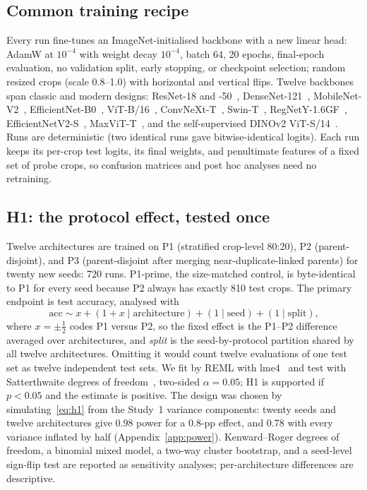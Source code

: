 \documentclass[11pt]{article}
\begin{document}
\subsection{Common training recipe}

Every run fine-tunes an ImageNet-initialised backbone with a new linear head: AdamW at
$10^{-4}$ with weight decay $10^{-4}$, batch 64, 20 epochs, final-epoch evaluation, no
validation split, early stopping, or checkpoint selection; random resized crops (scale
0.8--1.0) with horizontal and vertical flips. Twelve backbones span classic and modern
designs: ResNet-18 and -50~\citep{he2016resnet}, DenseNet-121~\citep{huang2017densenet},
MobileNet-V2~\citep{sandler2018mobilenetv2}, EfficientNet-B0~\citep{tan2019efficientnet},
ViT-B/16~\citep{dosovitskiy2021vit}, ConvNeXt-T~\citep{liu2022convnext},
Swin-T~\citep{liu2021swin}, RegNetY-1.6GF~\citep{radosavovic2020regnet},
EfficientNetV2-S~\citep{tan2021efficientnetv2}, MaxViT-T~\citep{tu2022maxvit}, and the
self-supervised DINOv2 ViT-S/14~\citep{oquab2024dinov2}. Runs are deterministic (two
identical runs gave bitwise-identical logits). Each run keeps its per-crop test logits, its
final weights, and penultimate features of a fixed set of probe crops, so confusion
matrices and post hoc analyses need no retraining.

\subsection{H1: the protocol effect, tested once}
\label{sec:h1}

Twelve architectures are trained on P1 (stratified crop-level 80:20), P2 (parent-disjoint),
and P3 (parent-disjoint after merging near-duplicate-linked parents) for twenty new seeds:
720 runs. P1-prime, the size-matched control, is byte-identical to P1 for every seed because
P2 always has exactly 810 test crops. The primary endpoint is test accuracy, analysed with
\begin{equation}
\text{acc} \sim x + (1 + x \mid \text{architecture}) + (1 \mid \text{seed}) + (1 \mid \text{split}),
\label{eq:h1}
\end{equation}
where $x=\pm\tfrac12$ codes P1 versus P2, so the fixed effect is the P1--P2 difference
averaged over architectures, and \emph{split} is the seed-by-protocol partition shared by
all twelve architectures. Omitting it would count twelve evaluations of one test set as
twelve independent test sets. We fit by REML with lme4~\citep{bates2015lme4} and test with
Satterthwaite degrees of freedom~\citep{kuznetsova2017lmertest}, two-sided $\alpha=0.05$;
H1 is supported if $p<0.05$ and the estimate is positive. The design was chosen by
simulating~\eqref{eq:h1} from the Study~1 variance components: twenty seeds and twelve
architectures give 0.98 power for a 0.8-pp effect, and 0.78 with every variance inflated
by half (Appendix~\ref{app:power}). Kenward--Roger degrees of freedom, a binomial
mixed model, a two-way cluster bootstrap, and a seed-level sign-flip test are reported as
sensitivity analyses; per-architecture differences are descriptive.
\end{document}
